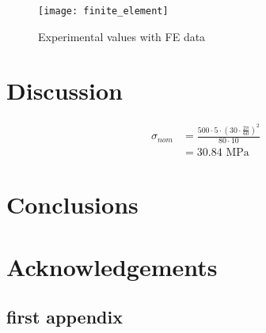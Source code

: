 \documentclass[12pt]{labreport}
\begin{document}
\begin{figure}[h]
    \centering
    \texttt{[image: finite\_element]}
    \caption{Experimental values with FE data}
    \label{fig:finite_element}
\end{figure}

\section{Discussion}
\begin{equation}
\begin{split}
    \sigma_{nom} & = \frac{500\cdot5\cdot(30\cdot\frac{2\pi}{60})^2}{80\cdot10} \\
                 & = 30.84 \text{ MPa}
\end{split}
\end{equation}

\section{Conclusions}

\section{Acknowledgements}



\backmatter
\begin{appendices}
\section{first appendix}

    
\end{appendices}
\end{document}
